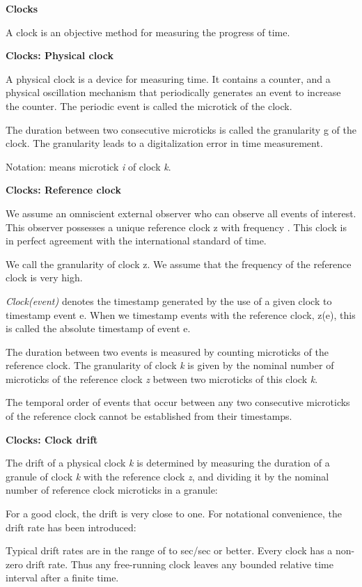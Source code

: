 \textbf{Clocks}

A clock is an objective method for measuring the progress of time.

\textbf{Clocks: Physical clock}

A physical clock is a device for measuring time. It contains a counter,
and a physical oscillation mechanism that periodically generates an
event to increase the counter. The periodic event is called the
microtick of the clock.

The duration between two consecutive microticks is called the
granularity g of the clock. The granularity leads to a digitalization
error in time measurement.

Notation: means microtick \emph{i} of clock \emph{k}.

\textbf{Clocks: Reference clock}

We assume an omniscient external observer who can observe all events of
interest. This observer possesses a unique reference clock z with
frequency . This clock is in perfect agreement with the international
standard of time.

We call the granularity of clock z. We assume that the frequency of the
reference clock is very high.

\emph{Clock(event)} denotes the timestamp generated by the use of a
given clock to timestamp event e. When we timestamp events with the
reference clock, z(e), this is called the absolute timestamp of event e.

The duration between two events is measured by counting microticks of
the reference clock. The granularity of clock \emph{k} is given by the
nominal number of microticks of the reference clock \emph{z} between two
microticks of this clock \emph{k}.

The temporal order of events that occur between any two consecutive
microticks of the reference clock cannot be established from their
timestamps.

\textbf{Clocks: Clock drift}

The drift of a physical clock \emph{k} is determined by measuring the
duration of a granule of clock \emph{k} with the reference clock
\emph{z}, and dividing it by the nominal number of reference clock
microticks in a granule:

For a good clock, the drift is very close to one. For notational
convenience, the drift rate has been introduced:

Typical drift rates are in the range of to sec/sec or better. Every
clock has a non-zero drift rate. Thus any free-running clock leaves any
bounded relative time interval after a finite time.

